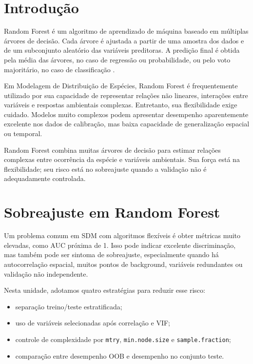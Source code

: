 \documentclass{ueap-sdm}
\begin{document}
\section{Introdução}

Random Forest é um algoritmo de aprendizado de máquina baseado em múltiplas árvores de decisão. Cada árvore é ajustada a partir de uma amostra dos dados e de um subconjunto aleatório das variáveis preditoras. A predição final é obtida pela média das árvores, no caso de regressão ou probabilidade, ou pelo voto majoritário, no caso de classificação \parencite{breiman2001random,cutler2007random,guisan2017habitat}.

Em Modelagem de Distribuição de Espécies, Random Forest é frequentemente utilizado por sua capacidade de representar relações não lineares, interações entre variáveis e respostas ambientais complexas. Entretanto, sua flexibilidade exige cuidado. Modelos muito complexos podem apresentar desempenho aparentemente excelente nos dados de calibração, mas baixa capacidade de generalização espacial ou temporal.

\begin{conceito}[title={\faBook\quad Random Forest em SDM}]
	Random Forest combina muitas árvores de decisão para estimar relações complexas entre ocorrência da espécie e variáveis ambientais. Sua força está na flexibilidade; seu risco está no sobreajuste quando a validação não é adequadamente controlada.
\end{conceito}

\section{Sobreajuste em Random Forest}

Um problema comum em SDM com algoritmos flexíveis é obter métricas muito elevadas, como AUC próxima de 1. Isso pode indicar excelente discriminação, mas também pode ser sintoma de sobreajuste, especialmente quando há autocorrelação espacial, muitos pontos de background, variáveis redundantes ou validação não independente.

Nesta unidade, adotamos quatro estratégias para reduzir esse risco:

\begin{itemize}
	\item separação treino/teste estratificada;
	\item uso de variáveis selecionadas após correlação e VIF;
	\item controle de complexidade por \texttt{mtry}, \texttt{min.node.size} e \texttt{sample.fraction};
	\item comparação entre desempenho OOB e desempenho no conjunto teste.
\end{itemize}
\end{document}
